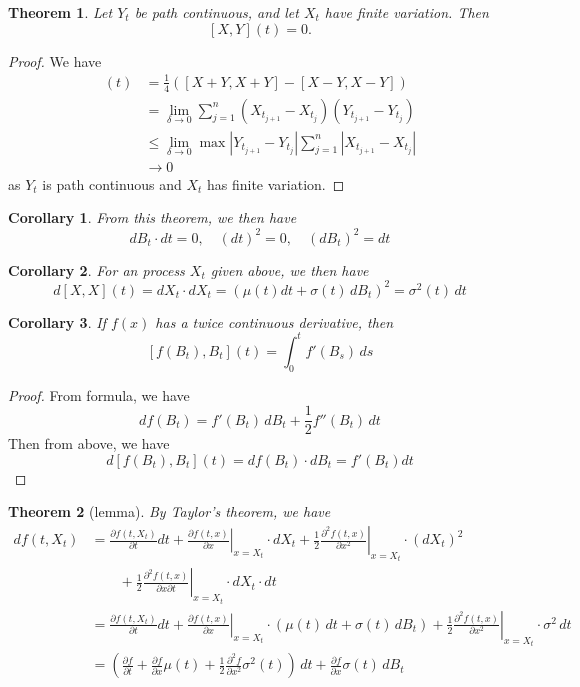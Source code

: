 \documentclass[10pt, oneside, reqno]{amsart}
\theoremstyle{plain}%
\newtheorem{thm}{Theorem}[section]
\newtheorem*{cor}{Corollary}
\theoremstyle{definition}
\theoremstyle{remark}
\begin{document}
\begin{thm}
    Let $Y_t$ be path continuous, and let $X_t$ have finite variation.  Then \[
        [X,Y](t) = 0.
    \]
\end{thm}
\begin{proof}
    We have \begin{align*}
        [X,Y](t)    &= \frac{1}{4}( [X+Y, X+Y] - [X-Y, X-Y]) \\
                    &= \lim_{\delta \rightarrow 0} \sum_{j=1}^n (X_{t_{j+1}} - X_{t_j})(Y_{t_{j+1}} - Y_{t_j}) \\
                    &\leq \lim_{\delta \rightarrow 0} \max | Y_{t_{j+1}} - Y_{t_j} | \sum_{j=1}^n | X_{t_{j+1}} - X_{t_j} | \\
                    &\rightarrow 0      
    \end{align*} as $Y_t$ is path continuous and $X_t$ has finite variation.
\end{proof}

\begin{cor}
    From this theorem, we then have \[
        dB_t \cdot dt = 0, \quad (dt)^2 = 0, \quad (dB_t)^2 = dt 
    \]
\end{cor}

\begin{cor}
    For an \ito process $X_t$ given above, we then have \[
        d[X,X](t) = dX_t \cdot dX_t = \left(\mu(t) dt + \sigma(t) \, dB_t \right)^2 = \sigma^2(t) \, dt
    \]
\end{cor}
\begin{cor}
    If $f(x)$ has a twice continuous derivative, then \[
    [f(B_t), B_t](t) = \int_0^t f'(B_s) \, ds
    \]
\end{cor}
\begin{proof}
    From \itos formula, we have \[
        df(B_t) = f'(B_t) \, dB_t + \frac{1}{2} f''(B_t) \, dt
    \]  Then from above, we have \[
        d[f(B_t), B_t] (t) = df(B_t) \cdot dB_t = f'(B_t) dt
    \]
\end{proof}
\begin{thm}[\itos lemma]
    By Taylor's theorem, we have \begin{align*}
        df(t, X_t) &= \frac{\partial f(t, X_t)}{\partial t} dt + \left.\frac{\partial f(t, x)}{\partial x}  \right|_{x = X_t} \cdot dX_t + \left.\frac{1}{2} \frac{\partial^2 f(t, x)}{\partial x^2} \right|_{x = X_t} \cdot (dX_t)^2 \\
        &\qquad + \left.\frac{1}{2} \frac{\partial^2 f(t, x)}{\partial x \partial t} \right|_{x = X_t} \cdot dX_t \cdot dt \\
        &= \frac{\partial f(t, X_t)}{\partial t} dt + \left.\frac{\partial f(t, x)}{\partial x}  \right|_{x = X_t} \cdot (\mu(t) \, dt + \sigma(t) \, dB_t) + \left.\frac{1}{2} \frac{\partial^2 f(t, x)}{\partial x^2} \right|_{x = X_t} \cdot \sigma^2 \, dt \\
        &= \left( \frac{\partial f}{\partial t} + \frac{\partial f}{\partial x} \mu(t) + \frac{1}{2} \frac{\partial^2 f}{\partial x^2} \sigma^2(t) \right) \, dt + \frac{\partial f}{\partial x} \sigma(t) \, dB_t
    \end{align*}
\end{thm}
\end{document}
